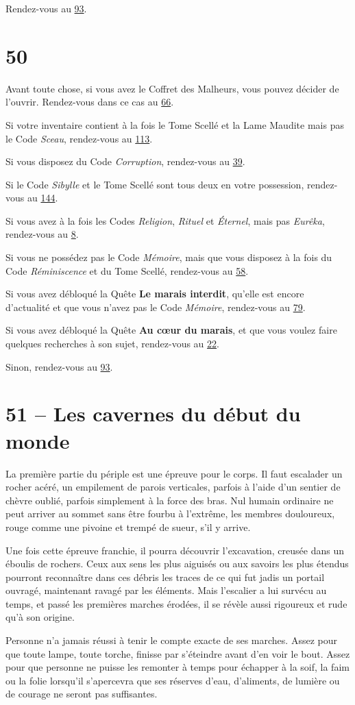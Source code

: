 \documentclass{report}
\newcommand{\gsection}[1]{
    \section{#1}
    \label{section-#1}
}
\newcommand{\glink}[1]{\hyperref[section-#1]{#1}}
\begin{document}
Rendez-vous au \glink{93}.

\gsection{50}

Avant toute chose, si vous avez le Coffret des Malheurs, vous pouvez décider de l'ouvrir. Rendez-vous dans ce cas au \glink{66}.

Si votre inventaire contient à la fois le Tome Scellé et la Lame Maudite mais pas le Code \emph{Sceau}, rendez-vous au \glink{113}.

Si vous disposez du Code \emph{Corruption}, rendez-vous au \glink{39}.

Si le Code \emph{Sibylle} et le Tome Scellé sont tous deux en votre possession, rendez-vous au \glink{144}.

Si vous avez à la fois les Codes \emph{Religion}, \emph{Rituel} et \emph{Éternel}, mais pas \emph{Eurêka}, rendez-vous au \glink{8}.

Si vous ne possédez pas le Code \emph{Mémoire}, mais que vous disposez à la fois du Code \emph{Réminiscence} et du Tome Scellé, rendez-vous au \glink{58}.

Si vous avez débloqué la Quête \textbf{Le marais interdit}, qu'elle est encore d'actualité et que vous n'avez pas le Code \emph{Mémoire}, rendez-vous au \glink{79}.

Si vous avez débloqué la Quête \textbf{Au cœur du marais}, et que vous voulez faire quelques recherches à son sujet, rendez-vous au \glink{22}.

Sinon, rendez-vous au \glink{93}.

\gsection{51 – Les cavernes du début du monde}

La première partie du périple est une épreuve pour le corps. Il faut escalader un rocher acéré, un empilement de parois verticales, parfois à l'aide d'un sentier de chèvre oublié, parfois simplement à la force des bras. Nul humain ordinaire ne peut arriver au sommet sans être fourbu à l'extrême, les membres douloureux, rouge comme une pivoine et trempé de sueur, s'il y arrive.

Une fois cette épreuve franchie, il pourra découvrir l'excavation, creusée dans un éboulis de rochers. Ceux aux sens les plus aiguisés ou aux savoirs les plus étendus pourront reconnaître dans ces débris les traces de ce qui fut jadis un portail ouvragé, maintenant ravagé par les éléments. Mais l'escalier a lui survécu au temps, et passé les premières marches érodées, il se révèle aussi rigoureux et rude qu'à son origine.

Personne n'a jamais réussi à tenir le compte exacte de ses marches. Assez pour que toute lampe, toute torche, finisse par s'éteindre avant d'en voir le bout. Assez pour que personne ne puisse les remonter à temps pour échapper à la soif, la faim ou la folie lorsqu'il s'apercevra que ses réserves d'eau, d'aliments, de lumière ou de courage ne seront pas suffisantes.
\end{document}

